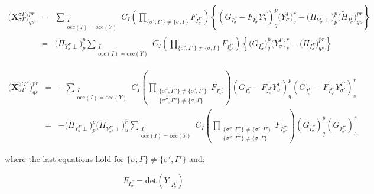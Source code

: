 \documentclass[a4paper,11pt]{article}
\newcommand{\irp}{\ensuremath{\Gamma}}
\newcommand{\irpP}{{\ensuremath{\Gamma'}}}
\newcommand{\irpPP}{{\ensuremath{\Gamma''}}}
\begin{document}
\begin{eqnarray}
  \big( \mathbf{X}_{\sigma \irp}^{\sigma \irp} \big)^{pr}_{qs} &=&
  \sum_{\substack{I\\\text{occ}(I) = \text{occ}(Y)}} C_I
  \left( \prod_{\{\sigma', \irpP\} \ne \{\sigma, \irp\}} F_{I_{\sigma'}^\irpP} \right)
  \left\{ \left( G_{I_\sigma^\irp} - F_{I_\sigma^\irp} Y_\sigma^\irp  \right)^p_q \big( Y_\sigma^\irp \big)^r_s
  - \big( \Pi_{Y_\sigma^\irp \perp} \big)^p_{\bar{p}} \big( \tilde{H}_{I_\sigma^\irp} \big)^{\bar{p}r}_{qs} \right\}\\
  &=&
  \big( \Pi_{Y_\sigma^\irp \perp} \big)^p_{\bar{p}}
  \sum_{\substack{I\\\text{occ}(I) = \text{occ}(Y)}} C_I
  \left( \prod_{\{\sigma', \irpP\} \ne \{\sigma, \irp\}} F_{I_{\sigma'}^\irpP} \right)
  \left\{ \big( G_{I_\sigma^\irp} \big)^{\bar{p}}_q \big( Y_\sigma^\irp \big)^r_s
  - \big( \tilde{H}_{I_\sigma^\irp} \big)^{{\bar{p}}r}_{qs} \right\}
\end{eqnarray}

\begin{eqnarray}
  \big( \mathbf{X}_{\sigma \irp}^{\sigma' \irpP} \big)^{pr}_{qs} &=&
  -%
  \sum_{\substack{I\\\text{occ}(I) = \text{occ}(Y)}} C_I
  \left(
    \prod_{\substack{
        \{\sigma'', \irpPP\} \ne \{\sigma', \irpP\} \\
        \{\sigma'', \irpPP\} \ne \{\sigma , \irp \}}}
    F_{I_{\sigma''}^{\irpPP}} \right)
  \left( G_{I_\sigma^\irp} - F_{I_\sigma^\irp} Y_\sigma^\irp  \right)^p_q
  \left( G_{I_{\sigma'}^\irpP} - F_{I_{\sigma'}^\irpP} Y_{\sigma'}^\irpP \right)^r_s\\
  &=&
  -%
  \big( \Pi_{Y_\sigma^\irp \perp} \big)^p_{\bar{p}}
  \big( \Pi_{Y_{\sigma'}^\irpP \perp} \big)^{\bar{r}}_u
  \sum_{\substack{I\\\text{occ}(I) = \text{occ}(Y)}} C_I
  \left(
    \prod_{\substack{
        \{\sigma'', \irpPP\} \ne \{\sigma', \irpP\} \\
        \{\sigma'', \irpPP\} \ne \{\sigma , \irp \}}}
    F_{I_{\sigma''}^{\irpPP}} \right)
  \left( G_{I_\sigma^\irp}  \right)^{\bar{p}}_q
  \left( G_{I_{\sigma'}^\irpP} \right)^{\bar{r}}_s
\end{eqnarray}

where the last equations hold for ${\{\sigma,\irp\} \ne \{\sigma',\irpP\}}$ and:

\begin{equation}
  F_{I_\sigma^\irp} = \text{det} \left( Y\big|_{I_\sigma^\irp} \right)
\end{equation}
\end{document}
